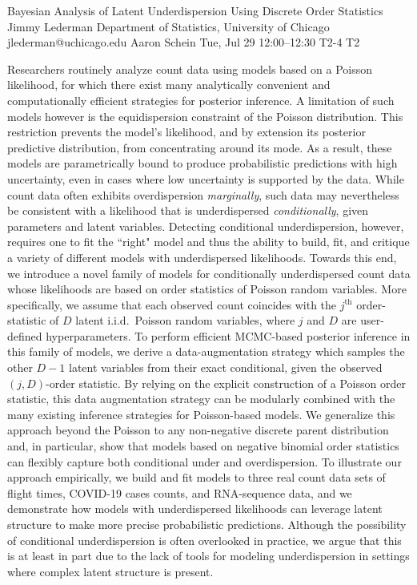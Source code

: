 \documentclass[12pt,lettersize,oneside]{book} %
\begin{document}
\begin{talk}
  {Bayesian Analysis of Latent Underdispersion Using Discrete Order Statistics}%
  {Jimmy Lederman}%
  {Department of Statistics, University of Chicago}%
  {jlederman@uchicago.edu}%
  {Aaron Schein}%
  {}%
  {Tue, Jul 29 12:00--12:30}%
  {T2-4}%
  {T2}%
  
    


Researchers routinely analyze count data using models based on a Poisson likelihood, for which there exist many analytically convenient and computationally efficient strategies for posterior inference. A limitation of such models however is the equidispersion constraint of the Poisson distribution. This restriction prevents the model's likelihood, and by extension its posterior predictive distribution, from concentrating around its mode. As a result, these models are parametrically bound to produce probabilistic predictions with high uncertainty, even in cases where low uncertainty is supported by the data. While count data often exhibits overdispersion \textit{marginally}, such data may nevertheless be consistent with a likelihood that is underdispersed \textit{conditionally}, given parameters and latent variables. Detecting conditional underdispersion, however, requires one to fit the ``right" model and thus the ability to build, fit, and critique a variety of different models with underdispersed likelihoods. Towards this end, we introduce a novel family of models for conditionally underdispersed count data whose likelihoods are based on order statistics of Poisson random variables. More specifically, we assume that each observed count coincides with the $j^{\textrm{th}}$ order-statistic of $D$ latent i.i.d.~Poisson random variables, where $j$ and $D$ are user-defined hyperparameters. To perform efficient MCMC-based posterior inference in this family of models, we derive a data-augmentation strategy which samples the other $D{-}1$ latent variables from their exact conditional, given the observed $(j,D)$-order statistic. By relying on the explicit construction of a Poisson order statistic, this data augmentation strategy can be modularly combined with the many existing inference strategies for Poisson-based models. We generalize this approach beyond the Poisson to any non-negative discrete parent distribution and, in particular, show that models based on negative binomial order statistics can flexibly capture both conditional under and overdispersion.  To illustrate our approach empirically, we build and fit models to three real count data sets of flight times, COVID-19 cases counts, and RNA-sequence data, and we demonstrate how models with underdispersed likelihoods can leverage latent structure to make more precise probabilistic predictions. Although the possibility of conditional underdispersion is often overlooked in practice, we argue that this is at least in part due to the lack of tools for modeling underdispersion in settings where complex latent structure is present.


\end{talk}
\end{document}
